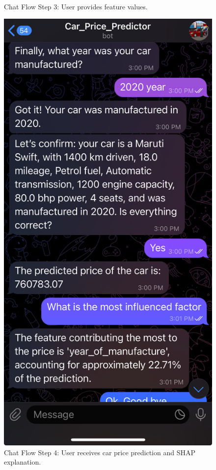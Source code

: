\documentclass[a4paper,12pt]{article}
\begin{document}
\begin{justify}
\begin{figure}[h!]
\begin{minipage}{0.45\textwidth}
		\caption{Chat Flow Step 3: User provides feature values.}
		\label{fig:step3}
	\end{minipage}%
	\hspace{0.05\textwidth} %
	\begin{minipage}{0.45\textwidth}
		\centering
		\includegraphics[width=\textwidth]{4.jpg}
		\caption{Chat Flow Step 4: User receives car price prediction and SHAP explanation.}
		\label{fig:step4}
	\end{minipage}
\end{figure}




\end{justify}
\end{document}
